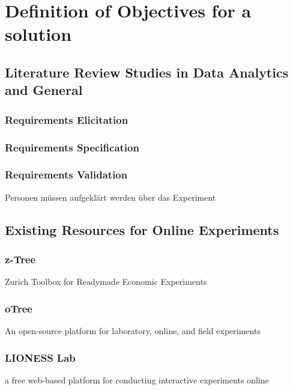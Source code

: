 \newpage\section{Definition of Objectives for a solution}\label{sec:objectForSolution}

\subsection{Literature Review Studies in Data Analytics and General}

\subsubsection{Requirements Elicitation}

\subsubsection{Requirements Specification}

\subsubsection{Requirements Validation}


Personen müssen aufgeklärt werden über das Experiment \cite{Dresch.2011}


\subsection{Existing Resources for Online Experiments}


\subsubsection{z-Tree}
Zurich Toolbox for Readymade Economic Experiments

\subsubsection{oTree}
An open-source platform for laboratory, online, and field experiments

\subsubsection{LIONESS Lab}
a free web-based platform for conducting interactive experiments online

